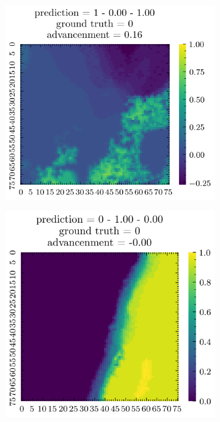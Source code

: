 \documentclass[../document.tex]{subfiles}
\begin{document}
\begin{figure}[H]
\begin{subfigure}[b]{0.19\textwidth}
    \end{subfigure}  
    \begin{subfigure}[b]{0.19\textwidth}
        \includegraphics[width=\linewidth]{../img/5/quarry/worst/patch-2d-2.png}
    \end{subfigure}
    \begin{subfigure}[b]{0.19\textwidth}
        \includegraphics[width=\linewidth]{../img/5/quarry/worst/patch-2d-3.png}

\end{subfigure}
\end{figure}
\end{document}
